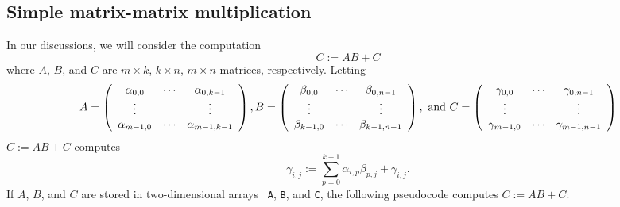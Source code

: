 \subsection{Simple matrix-matrix multiplication}

In our discussions, we will consider the computation
$$C:=AB + C$$
where $A$, $B$, and $C$ are $m\times k$, $k\times n$, $m\times n$  matrices, respectively. 
Letting 
{\footnotesize%
\[
A = 
\left( \begin{array}{c c c c}
\alpha_{0,0} & \cdots & \alpha_{0,k-1} \\
\vdots &  & \vdots \\
\alpha_{m-1,0} & \cdots & \alpha_{m-1,k-1} \\
\end{array}
\right),
B = 
\left( \begin{array}{c c c c}
\beta_{0,0} & \cdots & \beta_{0,n-1} \\
\vdots &  & \vdots \\
\beta_{k-1,0} & \cdots & \beta_{k-1,n-1} \\
\end{array}
\right), \mbox{~and~}
C = 
\left( \begin{array}{c c c c}
\gamma_{0,0} & \cdots & \gamma_{0,n-1} \\
\vdots &  & \vdots \\
\gamma_{m-1,0} & \cdots & \gamma_{m-1,n-1} \\
\end{array}
\right)
\]%
}
$ C := A B + C $ computes
\[
\gamma_{i,j} := \sum_{p=0}^{k-1} \alpha_{i,p} \beta_{p,j} +
\gamma_{i,j}.
\]
If $ A $, $ B $, and $ C $ are stored  in two-dimensional arrays {\tt
  A}, {\tt B}, and {\tt C}, 
the following pseudocode computes $ C := A B + C $:

